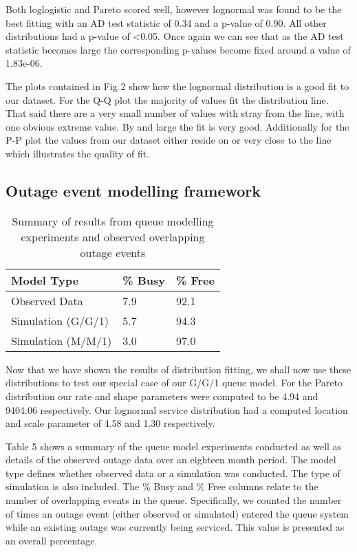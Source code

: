 \documentclass[5p]{elsarticle}
\begin{document}
Both loglogistic and Pareto scored well, however lognormal was found to be the best fitting with an AD test statistic of 0.34 and a p-value of 0.90. All other distributions had a p-value of \textless 0.05. Once again we can see that as the AD test statistic becomes large the corresponding p-values become fixed around a value of 1.83e-06.

The plots contained in Fig 2 show how the lognormal distribution is a good fit to our dataset. For the Q-Q plot the majority of values fit the distribution line. That said there are a very small number of values with stray from the line, with one obvious extreme value. By and large the fit is very good. Additionally for the P-P plot the values from our dataset either reside on or very close to the line which illustrates the quality of fit.


\subsection{Outage event modelling framework}

\begin {table}[]
\caption {Summary of results from queue modelling experiments and observed overlapping outage events} 
\begin{center}
\begin{tabular}{l | l | l} \bf{Model Type} & \bf {\% Busy} & \bf {\% Free}
\\ \hline Observed Data & 7.9 &  92.1 
\\  Simulation (G/G/1) & 5.7 &  94.3 
\\  Simulation (M/M/1) & 3.0  &  97.0 
\\ \hline 
 \end{tabular}
\end{center}
\end{table}

Now that we have shown the results of distribution fitting, we shall now use these distributions to test our special case of our G/G/1 queue model. For the Pareto distribution our rate and shape parameters were computed to be 4.94 and 9404.06 respectively. Our lognormal service distribution had a computed location and scale parameter of 4.58 and 1.30 respectively.

Table 5 shows a summary of the queue model experiments conducted as well as details of the observed outage data over an eighteen month period. The model type defines whether observed data or a simulation was conducted. The type of simulation is also included. The \% Busy and \% Free columns relate to the number of overlapping events in the queue. Specifically, we counted the number of times an outage event (either observed or simulated) entered the queue system while an existing outage was currently being serviced. This value is presented as an overall percentage. 
\end{document}
